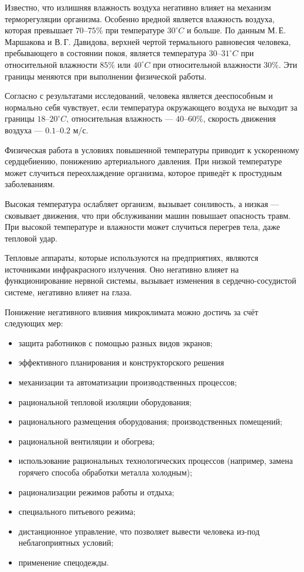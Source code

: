 \documentclass[a4paper,12pt,notitlepage,pdftex,headsepline]{scrartcl}
\begin{document}
  Известно, что излишняя влажность воздуха негативно влияет на механизм
  терморегуляции организма.
  Особенно вредной является влажность воздуха, которая превышает $70$--$75$\%
  при температуре $30^\circ C$ и больше.
  По данным М.\,Е. Маршакова и В.\,Г. Давидова, верхней чертой термального
  равновесия человека, пребывающего в состоянии покоя, является температура
  $30$--$31^\circ C$ при относительной влажности $85\%$ или $40^\circ C$ при
  относительной влажности $30\%$.
  Эти границы меняются при выполнении физической работы.

  Согласно с результатами исследований, человека является дееспособным и
  нормально себя чувствует, если температура окружающего воздуха не выходит за
  границы $18$--$20^\circ C$, относительная влажность --- $40$--$60\%$,
  скорость движения воздуха --- $0.1$--$0.2$ м/с.

  Физическая работа в условиях повышенной температуры приводит к ускоренному
  сердцебиению, понижению артериального давления.
  При низкой температуре может случиться переохлаждение организма, которое
  приведёт к простудным заболеваниям.

  Высокая температура ослабляет организм, вызывает сонливость, а низкая ---
  сковывает движения, что при обслуживании машин повышает опасность травм.
  При высокой температуре и влажности может случиться перегрев тела, даже
  тепловой удар.

  Тепловые аппараты, которые используются на предприятиях, являются
  источниками инфракрасного излучения.
  Оно негативно влияет на функционирование нервной системы, вызывает изменения
  в сердечно-сосудистой системе, негативно влияет на глаза.

  Понижение негативного влияния микроклимата можно достичь за счёт следующих
  мер:
  \begin{itemize}
    \item защита работников с помощью разных видов экранов;
    \item эффективного планирования и конструкторского решения
    \item механизации та автоматизации производственных процессов;
    \item рациональной тепловой изоляции оборудования;
    \item рационального размещения оборудования;
      производственных помещений;
    \item рациональной вентиляции и обогрева;
    \item использование рациональных технологических процессов (например,
      замена горячего способа обработки металла холодным);
    \item рационализации режимов работы и отдыха;
    \item специального питьевого режима;
    \item дистанционное управление, что позволяет вывести человека из-под
      неблагоприятных условий;
    \item применение спецодежды.
  \end{itemize}
\end{document}
